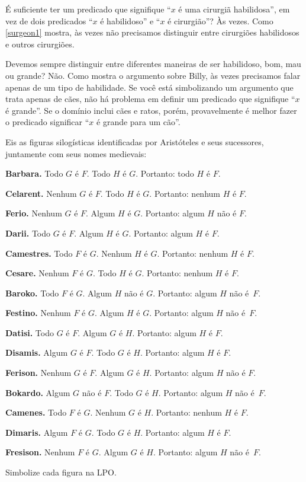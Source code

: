 É suficiente ter um predicado que signifique \textquotedblleft $x$ é uma cirurgiã habilidosa\textquotedblright{}, em vez de dois predicados \textquotedblleft $x$ é habilidoso\textquotedblright{} e \textquotedblleft $x$ é cirurgião\textquotedblright{}? Às vezes. Como \cref{surgeon1} mostra, às vezes não precisamos distinguir entre cirurgiões habilidosos e outros cirurgiões.

Devemos sempre distinguir entre diferentes maneiras de ser habilidoso, bom, mau ou grande? Não. Como mostra o argumento sobre Billy, às vezes precisamos falar apenas de um tipo de habilidade. Se você está simbolizando um argumento que trata apenas de cães, não há problema em definir um predicado que signifique \textquotedblleft $x$ é grande\textquotedblright{}. Se o domínio inclui cães e ratos, porém, provavelmente é melhor fazer o predicado significar \textquotedblleft $x$ é grande para um cão\textquotedblright{}.

\practiceproblems
\problempart
{}\label{pr.BarbaraEtc}
Eis as figuras silogísticas identificadas por Aristóteles e seus sucessores, juntamente com seus nomes medievais:
\begin{compactlist}
	\item \textbf{Barbara.} Todo $G$ é $F$. Todo $H$ é $G$. Portanto: todo $H$ é $F$.
	\item \textbf{Celarent.} Nenhum $G$ é $F$. Todo $H$ é $G$. Portanto: nenhum $H$ é $F$.
	\item \textbf{Ferio.} Nenhum $G$ é $F$. Algum $H$ é $G$. Portanto: algum $H$ não é $F$.
	\item \textbf{Darii.} Todo $G$ é $F$. Algum $H$ é $G$. Portanto: algum $H$ é $F$.
	\item \textbf{Camestres.} Todo $F$ é $G$. Nenhum $H$ é $G$. Portanto: nenhum $H$ é $F$.
	\item \textbf{Cesare.} Nenhum $F$ é $G$. Todo $H$ é $G$. Portanto: nenhum $H$ é $F$.
	\item \textbf{Baroko.} Todo $F$ é $G$. Algum $H$ não é $G$. Portanto: algum $H$ não é~$F$.
	\item \textbf{Festino.} Nenhum $F$ é $G$. Algum $H$ é $G$. Portanto: algum $H$ não é~$F$.
	\item \textbf{Datisi.} Todo $G$ é $F$. Algum $G$ é $H$. Portanto: algum $H$ é $F$.
	\item \textbf{Disamis.} Algum $G$ é $F$. Todo $G$ é $H$. Portanto: algum $H$ é $F$.
	\item \textbf{Ferison.} Nenhum $G$ é $F$. Algum $G$ é $H$. Portanto: algum $H$ não é $F$.
	\item \textbf{Bokardo.} Algum $G$ não é $F$. Todo $G$ é $H$. Portanto: algum $H$ não é~$F$.
	\item \textbf{Camenes.} Todo $F$ é $G$. Nenhum $G$ é $H$. Portanto: nenhum $H$ é $F$.
	\item \textbf{Dimaris.} Algum $F$ é $G$. Todo $G$ é $H$. Portanto: algum $H$ é $F$.
	\item \textbf{Fresison.} Nenhum $F$ é $G$. Algum $G$ é $H$. Portanto: algum $H$ não é~$F$.
\end{compactlist}
Simbolize cada figura na LPO.

